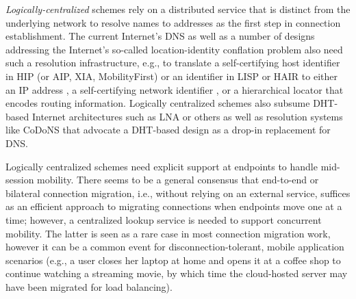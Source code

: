 {{\em Logically-centralized} schemes rely on a distributed service that is distinct from the underlying network to resolve names to addresses as the first step in connection establishment. The current Internet's DNS as well as a number of designs addressing the Internet's so-called location-identity conflation problem also need such a resolution infrastructure, e.g., to translate a self-certifying host identifier in HIP \cite{HIP} (or AIP\cite{AIP}, XIA\cite{XIA}, MobilityFirst\cite{MobilityFirst-UMASS}) or an identifier in LISP \cite{LISP} or HAIR \cite{HAIR} to either an IP address \cite{HIP}, a self-certifying network identifier \cite{AIP,XIA,MobilityFirst-UMASS}, or a hierarchical locator \cite{HAIR} that encodes routing information. Logically centralized schemes also subsume DHT-based Internet architectures such as LNA \cite{LNA} or others \cite{DOA,UIP} as well as resolution systems like CoDoNS \cite{codons-paper} that advocate a DHT-based design as a drop-in replacement for DNS.


Logically centralized schemes need explicit  support at endpoints to handle mid-session mobility. There seems to be a general consensus \cite{Migrate,ECCP,TCP-R} that end-to-end or bilateral connection migration, i.e., without relying on an external service, suffices as an efficient approach to migrating connections when endpoints move one at a time; however, a centralized lookup service is needed to support concurrent mobility. The latter is seen as a rare case in most connection migration work, however it can be a common event for disconnection-tolerant, mobile application scenarios (e.g., a user closes her laptop at home and opens it at a coffee shop to continue watching a streaming movie, by which time the cloud-hosted server may have been migrated for load balancing).

}
